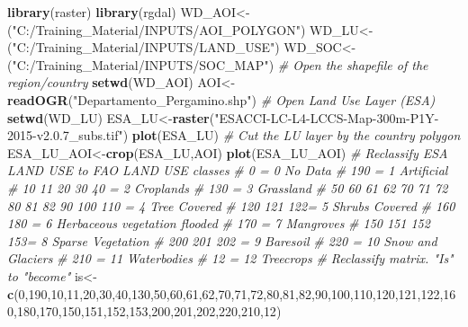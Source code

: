 \documentclass[
  10pt,
  b5paper,
]{book}
\newenvironment{Shaded}{\begin{snugshade}}{\end{snugshade}}
\newcommand{\CommentTok}[1]{\textcolor[rgb]{0.56,0.35,0.01}{\textit{#1}}}
\newcommand{\DecValTok}[1]{\textcolor[rgb]{0.00,0.00,0.81}{#1}}
\newcommand{\KeywordTok}[1]{\textcolor[rgb]{0.13,0.29,0.53}{\textbf{#1}}}
\newcommand{\NormalTok}[1]{#1}
\newcommand{\StringTok}[1]{\textcolor[rgb]{0.31,0.60,0.02}{#1}}
\begin{document}
\begin{Shaded}
\begin{Highlighting}[]
\KeywordTok{library}\NormalTok{(raster)}
\KeywordTok{library}\NormalTok{(rgdal)}
\NormalTok{WD_AOI<-(}\StringTok{"C:/Training_Material/INPUTS/AOI_POLYGON"}\NormalTok{)}
\NormalTok{WD_LU<-(}\StringTok{"C:/Training_Material/INPUTS/LAND_USE"}\NormalTok{)}
\NormalTok{WD_SOC<-(}\StringTok{"C:/Training_Material/INPUTS/SOC_MAP"}\NormalTok{)}
\CommentTok{# Open the shapefile of the region/country}
\KeywordTok{setwd}\NormalTok{(WD_AOI)}
\NormalTok{AOI<-}\KeywordTok{readOGR}\NormalTok{(}\StringTok{"Departamento_Pergamino.shp"}\NormalTok{)}
\CommentTok{# Open Land Use Layer (ESA)}
\KeywordTok{setwd}\NormalTok{(WD_LU)}
\NormalTok{ESA_LU<-}\KeywordTok{raster}\NormalTok{(}\StringTok{"ESACCI-LC-L4-LCCS-Map-300m-P1Y-2015-v2.0.7_subs.tif"}\NormalTok{)}
\KeywordTok{plot}\NormalTok{(ESA_LU)}
\CommentTok{# Cut the LU layer by the country polygon}
\NormalTok{ESA_LU_AOI<-}\KeywordTok{crop}\NormalTok{(ESA_LU,AOI)}
\KeywordTok{plot}\NormalTok{(ESA_LU_AOI)}
\CommentTok{# Reclassify ESA LAND USE to FAO LAND USE classes}
\CommentTok{#     0 = 0   No Data}
\CommentTok{#   190 = 1 Artificial}
\CommentTok{#   10 11 20 30 40 = 2 Croplands}
\CommentTok{#   130 = 3 Grassland}
\CommentTok{#   50 60 61 62 70 71 72 80 81 82 90 100 110 = 4 Tree Covered}
\CommentTok{#   120 121 122= 5 Shrubs Covered}
\CommentTok{#   160 180 = 6 Herbaceous vegetation flooded}
\CommentTok{#   170 = 7 Mangroves}
\CommentTok{#   150 151 152 153= 8 Sparse Vegetation}
\CommentTok{#   200 201 202 = 9 Baresoil}
\CommentTok{#   220 = 10 Snow and Glaciers}
\CommentTok{#   210 = 11 Waterbodies}
\CommentTok{#   12 = 12 Treecrops}
\CommentTok{# Reclassify matrix. "Is" to "become"}
\NormalTok{is<-}\KeywordTok{c}\NormalTok{(}\DecValTok{0}\NormalTok{,}\DecValTok{190}\NormalTok{,}\DecValTok{10}\NormalTok{,}\DecValTok{11}\NormalTok{,}\DecValTok{20}\NormalTok{,}\DecValTok{30}\NormalTok{,}\DecValTok{40}\NormalTok{,}\DecValTok{130}\NormalTok{,}\DecValTok{50}\NormalTok{,}\DecValTok{60}\NormalTok{,}\DecValTok{61}\NormalTok{,}\DecValTok{62}\NormalTok{,}\DecValTok{70}\NormalTok{,}\DecValTok{71}\NormalTok{,}\DecValTok{72}\NormalTok{,}\DecValTok{80}\NormalTok{,}\DecValTok{81}\NormalTok{,}\DecValTok{82}\NormalTok{,}\DecValTok{90}\NormalTok{,}\DecValTok{100}\NormalTok{,}\DecValTok{110}\NormalTok{,}\DecValTok{120}\NormalTok{,}\DecValTok{121}\NormalTok{,}\DecValTok{122}\NormalTok{,}\DecValTok{160}\NormalTok{,}\DecValTok{180}\NormalTok{,}\DecValTok{170}\NormalTok{,}\DecValTok{150}\NormalTok{,}\DecValTok{151}\NormalTok{,}\DecValTok{152}\NormalTok{,}\DecValTok{153}\NormalTok{,}\DecValTok{200}\NormalTok{,}\DecValTok{201}\NormalTok{,}\DecValTok{202}\NormalTok{,}\DecValTok{220}\NormalTok{,}\DecValTok{210}\NormalTok{,}\DecValTok{12}\NormalTok{)}

\end{Highlighting}
\end{Shaded}
\end{document}
